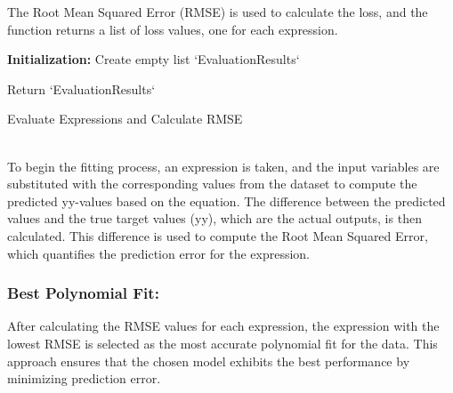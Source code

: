 \documentclass{article}
\begin{document}
The Root Mean Squared Error (RMSE) is used to calculate the loss, and the function returns a list of loss values, one for each expression.\\


\begin{algorithm}[H]
\SetAlgoLined
{}

\textbf{Initialization:}\;
Create empty list `EvaluationResults`\;


Return `EvaluationResults`\;

\caption{Evaluate Expressions and Calculate RMSE}
\label{alg:evaluate_expressions} %
\end{algorithm}\\

To begin the fitting process, an expression is taken, and the input variables are substituted with the corresponding values from the dataset to compute the predicted yy-values based on the equation. The difference between the predicted values and the true target values (yy), which are the actual outputs, is then calculated. This difference is used to compute the Root Mean Squared Error, which quantifies the prediction error for the expression.\\

\subsubsection{Best Polynomial Fit:}

After calculating the RMSE values for each expression, the expression with the lowest RMSE is selected as the most accurate polynomial fit for the data. This approach ensures that the chosen model exhibits the best performance by minimizing prediction error.\\
\end{document}
